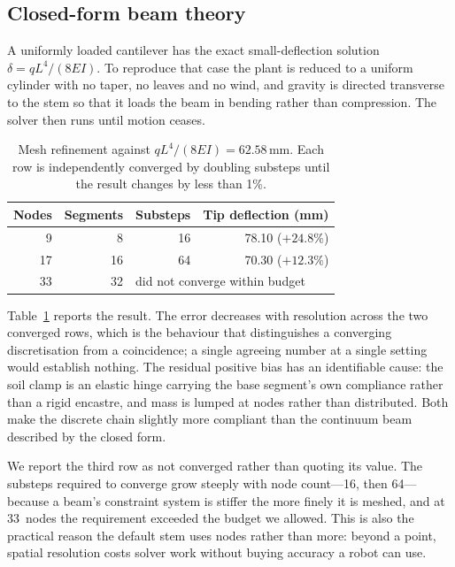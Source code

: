 \documentclass[conference]{IEEEtran}
\begin{document}
\subsection{Closed-form beam theory}

A uniformly loaded cantilever has the exact small-deflection solution
$\delta = qL^4/(8EI)$. To reproduce that case the plant is reduced to a
uniform cylinder with no taper, no leaves and no wind, and gravity is directed
transverse to the stem so that it loads the beam in bending rather than
compression. The solver then runs until motion ceases.

\begin{table}[t]
\caption{Mesh refinement against $qL^4/(8EI) = 62.58$\,mm. Each row is
independently converged by doubling substeps until the result changes by less
than 1\%.}
\label{tab:refinement}
\centering
\begin{tabular}{rrrr}
\toprule
Nodes & Segments & Substeps & Tip deflection (mm) \\
\midrule
9  & 8  & 16 & 78.10 \quad ($+24.8\%$) \\
17 & 16 & 64 & 70.30 \quad ($+12.3\%$) \\
33 & 32 & \multicolumn{2}{l}{did not converge within budget} \\
\bottomrule
\end{tabular}
\end{table}

Table~\ref{tab:refinement} reports the result. The error decreases with
resolution across the two converged rows, which is the behaviour that
distinguishes a converging discretisation from a coincidence; a single
agreeing number at a single setting would establish nothing. The residual
positive bias has an identifiable cause: the soil clamp is an elastic hinge
carrying the base segment's own compliance rather than a rigid encastre, and
mass is lumped at nodes rather than distributed. Both make the discrete chain
slightly more compliant than the continuum beam described by the closed form.

We report the third row as not converged rather than quoting its value. The
substeps required to converge grow steeply with node count---16, then 64---
because a beam's constraint system is stiffer the more finely it is meshed,
and at 33~nodes the requirement exceeded the budget we allowed. This is also
the practical reason the default stem uses \StemNodes{} nodes rather than
more: beyond a point, spatial resolution costs solver work without buying
accuracy a robot can use.
\end{document}
